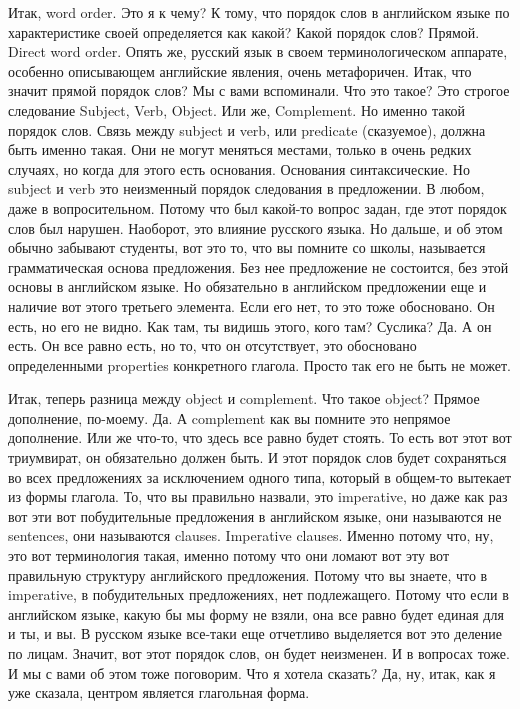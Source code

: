 \documentclass[main.tex]{subfiles}
\begin{document}
Итак, word order.
Это я к чему? К тому, что порядок слов в английском языке по характеристике своей определяется как какой?
Какой порядок слов? Прямой.
Direct word order.
Опять же, русский язык в своем терминологическом аппарате, особенно описывающем английские явления, очень метафоричен.
Итак, что значит прямой порядок слов?
Мы с вами вспоминали.
Что это такое?
Это строгое следование Subject, Verb, Object.
Или же, Complement.
Но именно такой порядок слов.
Связь между subject и verb, или predicate (сказуемое), должна быть именно такая.
Они не могут меняться местами, только в очень редких случаях, но когда для этого есть основания.
Основания синтаксические.
Но subject и verb это неизменный порядок следования в предложении.
В любом, даже в вопросительном.
Потому что был какой-то вопрос задан, где этот порядок слов был нарушен.
Наоборот, это влияние русского языка.
Но дальше, и об этом обычно забывают студенты, вот это то, что вы помните со школы, называется грамматическая основа предложения.
Без нее предложение не состоится, без этой основы в английском языке.
Но обязательно в английском предложении еще и наличие вот этого третьего элемента.
Если его нет, то это тоже обосновано.
Он есть, но его не видно.
Как там, ты видишь этого, кого там? Суслика?
Да.
А он есть.
Он все равно есть, но то, что он отсутствует, это обосновано определенными properties конкретного глагола.
Просто так его не быть не может.

Итак, теперь разница между object и complement.
Что такое object?
Прямое дополнение, по-моему.
Да.
А complement как вы помните это непрямое дополнение.
Или же что-то, что здесь все равно будет стоять.
То есть вот этот вот триумвират, он обязательно должен быть.
И этот порядок слов будет сохраняться во всех предложениях за исключением одного типа, который в общем-то вытекает из формы глагола.
То, что вы правильно назвали, это imperative, но даже как раз вот эти вот побудительные предложения в английском языке, они называются не sentences, они называются clauses.
Imperative clauses.
Именно потому что, ну, это вот терминология такая, именно потому что они ломают вот эту вот правильную структуру английского предложения.
Потому что вы знаете, что в imperative, в побудительных предложениях, нет подлежащего.
Потому что если в английском языке, какую бы мы форму не взяли, она все равно будет единая для и ты, и вы.
В русском языке все-таки еще отчетливо выделяется вот это деление по лицам.
Значит, вот этот порядок слов, он будет неизменен.
И в вопросах тоже.
И мы с вами об этом тоже поговорим.
Что я хотела сказать?
Да, ну, итак, как я уже сказала, центром является глагольная форма.
\end{document}
